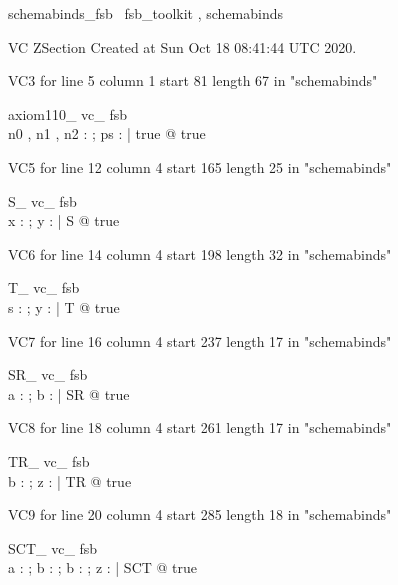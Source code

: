 \documentclass{article}
\begin{document}

\begin{zsection}	 \SECTION schemabinds\_fsb \parents~fsb\_toolkit , schemabinds
\end{zsection}

VC ZSection Created at Sun Oct 18 08:41:44 UTC 2020.

VC3 for line 5 column 1 start 81 length 67 in "schemabinds"
\begin{theorem}{ axiom110\_ vc\_ fsb}\\
 \exists n0 , n1 , n2 : \nat ; ps : \power \nat | true @ true \\

\end{theorem}

VC5 for line 12 column 4 start 165 length 25 in "schemabinds"
\begin{theorem}{ S\_ vc\_ fsb}\\
 \exists x : \nat ; y : \nat | S @ true \\

\end{theorem}

VC6 for line 14 column 4 start 198 length 32 in "schemabinds"
\begin{theorem}{ T\_ vc\_ fsb}\\
 \exists s : \power \nat ; y : \nat | T @ true \\

\end{theorem}

VC7 for line 16 column 4 start 237 length 17 in "schemabinds"
\begin{theorem}{ SR\_ vc\_ fsb}\\
 \exists a : \nat ; b : \nat | SR @ true \\

\end{theorem}

VC8 for line 18 column 4 start 261 length 17 in "schemabinds"
\begin{theorem}{ TR\_ vc\_ fsb}\\
 \exists b : \nat ; z : \power \nat | TR @ true \\

\end{theorem}

VC9 for line 20 column 4 start 285 length 18 in "schemabinds"
\begin{theorem}{ SCT\_ vc\_ fsb}\\
 \exists a : \nat ; b : \nat ; b : \nat ; z : \power \nat | SCT @ true \\

\end{theorem}
\end{document}
